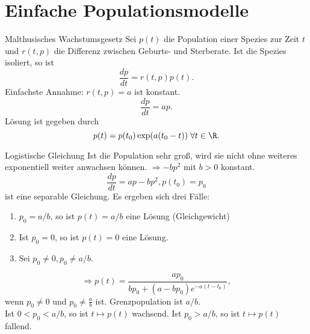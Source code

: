 \section{Einfache Populationsmodelle}

\begin{karte}{Malthusisches Wachstumsgesetz}
    Sei \(p(t) \) die Population einer Spezies zur Zeit \(t\) 
    und \(r(t,p)\) die Differenz zwischen Geburts- und Sterberate. 
    Ist die Spezies isoliert, so ist 
    \[ \frac{dp}{dt} = r(t,p)p(t). \]
    Einfachste Annahme: \(r(t,p) = a\) ist konstant. 
    \[ \frac{dp}{dt} = ap. \]
    Lösung ist gegeben durch 
    \[ p(t) = p(t_0) \exp(a(t_0-t)) \;\forall t\in \R. \]
\end{karte}

\begin{karte}{Logistische Gleichung}
    Ist die Population sehr groß, wird sie nicht ohne weiteres 
    exponentiell weiter anwachsen können. \(\Rightarrow -bp^2\) mit 
    \(b>0\) konstant.
    \[ \frac{dp}{dt} = ap - bp^2, p(t_0) = p_0 \]
    ist eine separable Gleichung. Es ergeben sich drei Fälle:
    \begin{enumerate}
        \item \( p_0 = a/b \), so ist \(p(t) = a/b\) eine Lösung (Gleichgewicht)
        \item Ist \(p_0 = 0\), so ist \(p(t) = 0\) eine Lösung.
        \item Sei \(p_0 \neq 0, p_0 \neq a/b\). 
    \end{enumerate}
    \[ \Rightarrow p(t) = \frac{a p_0}{b p_0 + (a-bp_0) e^{-a(t-t_0)}}, \]
    wenn \(p_0 \neq 0\) und \(p_0 \neq \frac{a}{b}\) ist.
    Grenzpopulation ist \(a/b\).\\
    Ist \(0<p_0<a/b\), so ist \(t\mapsto p(t)\) wachsend. 
    Ist \(p_0 > a/b\), so ist \(t\mapsto p(t)\) fallend.
\end{karte}